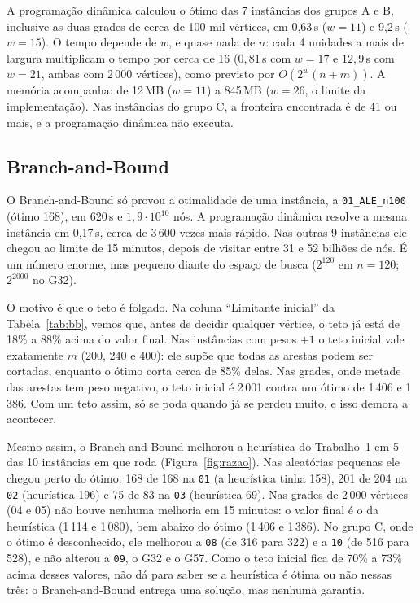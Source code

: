 A programação dinâmica calculou o ótimo das 7 instâncias dos grupos A e B, inclusive as duas grades de cerca de 100 mil vértices, em 0,63\,s ($w=11$) e 9,2\,s ($w=15$). O tempo depende de $w$, e quase nada de $n$: cada 4 unidades a mais de largura multiplicam o tempo por cerca de 16 ($0{,}81$\,s com $w=17$ e $12{,}9$\,s com $w=21$, ambas com 2\,000 vértices), como previsto por $O(2^{w}(n+m))$. A memória acompanha: de 12\,MB ($w=11$) a 845\,MB ($w=26$, o limite da implementação). Nas instâncias do grupo C, a fronteira encontrada é de 41 ou mais, e a programação dinâmica não executa.

\subsection{Branch-and-Bound}

O Branch-and-Bound só provou a otimalidade de uma instância, a \texttt{01\_ALE\_n100} (ótimo 168), em 620\,s e $1{,}9\cdot10^{10}$ nós. A programação dinâmica resolve a mesma instância em 0,17\,s, cerca de 3\,600 vezes mais rápido. Nas outras 9 instâncias ele chegou ao limite de 15 minutos, depois de visitar entre 31 e 52 bilhões de nós. É um número enorme, mas pequeno diante do espaço de busca ($2^{120}$ em $n=120$; $2^{2000}$ no G32).

O motivo é que o teto é folgado. Na coluna ``Limitante inicial'' da Tabela~\ref{tab:bb}, vemos que, antes de decidir qualquer vértice, o teto já está de 18\% a 88\% acima do valor final. Nas instâncias com pesos $+1$ o teto inicial vale exatamente $m$ (200, 240 e 400): ele supõe que todas as arestas podem ser cortadas, enquanto o ótimo corta cerca de 85\% delas. Nas grades, onde metade das arestas tem peso negativo, o teto inicial é 2\,001 contra um ótimo de 1\,406 e 1\,386. Com um teto assim, só se poda quando já se perdeu muito, e isso demora a acontecer.

Mesmo assim, o Branch-and-Bound melhorou a heurística do Trabalho~1 em 5 das 10 instâncias em que roda (Figura~\ref{fig:razao}). Nas aleatórias pequenas ele chegou perto do ótimo: 168 de 168 na \texttt{01} (a heurística tinha 158), 201 de 204 na \texttt{02} (heurística 196) e 75 de 83 na \texttt{03} (heurística 69). Nas grades de 2\,000 vértices (04 e 05) não houve nenhuma melhoria em 15 minutos: o valor final é o da heurística (1\,114 e 1\,080), bem abaixo do ótimo (1\,406 e 1\,386). No grupo C, onde o ótimo é desconhecido, ele melhorou a \texttt{08} (de 316 para 322) e a \texttt{10} (de 516 para 528), e não alterou a \texttt{09}, o G32 e o G57. Como o teto inicial fica de 70\% a 73\% acima desses valores, não dá para saber se a heurística é ótima ou não nessas três: o Branch-and-Bound entrega uma solução, mas nenhuma garantia.

